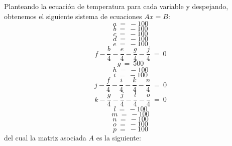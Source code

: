 Planteando la ecuación de temperatura para cada variable y despejando, obtenemos el siguiente sistema de ecuaciones $Ax=B$:
\begin{equation}
 a\ =\ -100
\end{equation}
\begin{equation}
 b\ =\ -100
\end{equation}
\begin{equation}
 c\ =\ -100
\end{equation}
\begin{equation}
 d\ =\ -100
\end{equation}
\begin{equation}
 e\ =\ -100
\end{equation}
\begin{equation}
 f - \frac{b}{4} - \frac{e}{4} - \frac{g}{4} - \frac{j}{4}\ =\ 0
\end{equation}
\begin{equation}
 g\ =\ 500
\end{equation}
\begin{equation}
 h\ =\ -100
\end{equation}
\begin{equation}
 i\ =\ -100
\end{equation}
\begin{equation}
 j- \frac{f}{4} - \frac{i}{4} - \frac{k}{4} - \frac{n}{4}\ =\ 0
\end{equation}
\begin{equation}
 k- \frac{g}{4} - \frac{j}{4} - \frac{l}{4} - \frac{o}{4}\ =\ 0
\end{equation}
\begin{equation}
 l\ =\ -100
\end{equation}
\begin{equation}
 m\ =\ -100
\end{equation}
\begin{equation}
 n\ =\ -100
\end{equation}
\begin{equation}
 o\ =\ -100
\end{equation}
\begin{equation}
 p\ =\ -100
\end{equation}
 del cual la matriz asociada $A$ es la siguiente:
